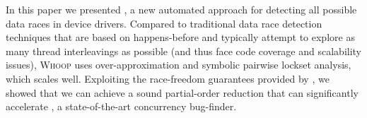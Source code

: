 In this paper we presented \whoop, a new automated approach for detecting all possible data races in device drivers. Compared to traditional data race detection techniques that are based on happens-before and typically attempt to explore as many thread interleavings as possible (and thus face code coverage and scalability issues), \textsc{Whoop} uses over-approximation and symbolic pairwise lockset analysis, which scales well. Exploiting the race-freedom guarantees provided by \whoop, we showed that we can achieve a sound partial-order reduction that can significantly accelerate \corral, a state-of-the-art concurrency bug-finder. 
